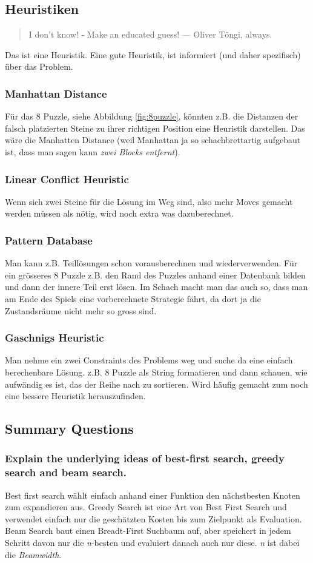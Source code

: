  \subsection{Heuristiken}
 \begin{quote}
 	I don't know! - Make an educated guess! --- Oliver Töngi, always.
 \end{quote}
 Das ist eine Heuristik. Eine gute Heuristik, ist informiert (und daher spezifisch) über das Problem.
 \subsubsection{Manhattan Distance}
 Für das 8 Puzzle, siehe Abbildung \ref{fig:8puzzle}, könnten z.B. die Distanzen der falsch platzierten Steine zu ihrer richtigen Position eine Heuristik darstellen. Das wäre die Manhatten Distance (weil Manhattan ja so schachbrettartig aufgebaut ist, dass man sagen kann \textit{zwei Blocks entfernt}).
 \subsubsection{Linear Conflict Heuristic} 
 Wenn sich zwei Steine für die Lösung im Weg sind, also mehr Moves gemacht werden müssen als nötig, wird noch extra was dazuberechnet.
 \subsubsection{Pattern Database}
 Man kann z.B. Teillösungen schon vorausberechnen und wiederverwenden. Für ein grösseres 8 Puzzle z.B. den Rand des Puzzles anhand einer Datenbank bilden und dann der innere Teil erst lösen. Im Schach macht man das auch so, dass man am Ende des Spiels eine vorberechnete Strategie fährt, da dort ja die Zustandsräume nicht mehr so gross sind.
 \subsubsection{Gaschnigs Heuristic}
 Man nehme ein zwei Constraints des Problems weg und suche da eine einfach berechenbare Lösung. z.B. 8 Puzzle als String formatieren und dann schauen, wie aufwändig es ist, das der Reihe nach zu sortieren. Wird häufig gemacht zum noch eine bessere Heuristik herauszufinden. 
 \subsection{Summary Questions}
\subsubsection{Explain the underlying ideas of best-first search, greedy search and beam search.}
Best first search wählt einfach anhand einer Funktion den nächstbesten Knoten zum expandieren aus. Greedy Search ist eine Art von Best First Search und verwendet einfach nur die geschätzten Kosten bis zum Zielpunkt als Evaluation. Beam Search baut einen Breadt-First Suchbaum auf, aber speichert in jedem Schritt davon nur die \textit{n}-besten und evaluiert danach auch nur diese. \textit{n} ist dabei die \textit{Beamwidth}. 
